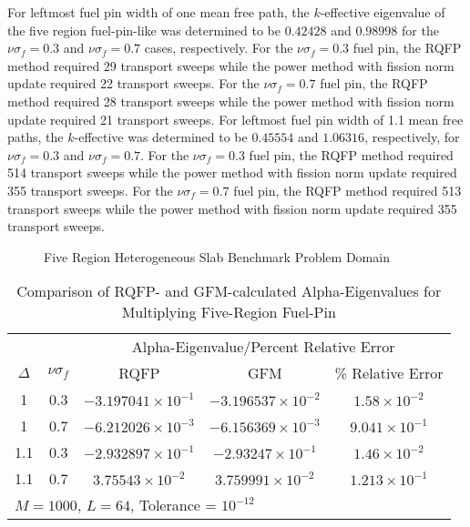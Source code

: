 For leftmost fuel pin width of one mean free path, the $k$-effective eigenvalue of the five region fuel-pin-like was determined to be $0.42428$ and $0.98998$ for the $\nu \sigma_{f} = 0.3$ and $\nu \sigma_{f} = 0.7$ cases, respectively. For the $\nu \sigma_{f} = 0.3$ fuel pin, the RQFP method required 29 transport sweeps while the power method with fission norm update required 22 transport sweeps. For the $\nu \sigma_{f} = 0.7$ fuel pin, the RQFP method required 28 transport sweeps while the power method with fission norm update required 21 transport sweeps. For leftmost fuel pin width of 1.1 mean free paths, the $k$-effective was determined to be $0.45554$ and $1.06316$, respectively, for  $\nu \sigma_{f} = 0.3$ and $\nu \sigma_{f} = 0.7$. For the $\nu \sigma_{f} = 0.3$ fuel pin, the RQFP method required 514 transport sweeps while the power method with fission norm update required 355 transport sweeps. For the $\nu \sigma_{f} = 0.7$ fuel pin, the RQFP method required 513 transport sweeps while the power method with fission norm update required 355 transport sweeps.

\begin{figure}[!htbp]
	\centering
	
	\caption{Five Region Heterogeneous Slab Benchmark Problem Domain \cite{kornreich_timeeigenvalue_2005}}
	\label{fig:FiveRegionProblem}
\end{figure}

\begin{table}[!htbp]
\centering{}
\caption{Comparison of RQFP- and GFM-calculated Alpha-Eigenvalues for Multiplying Five-Region Fuel-Pin}
\label{table:FiveRegionCases}
\begin{tabular}{@{}ccccc@{}}\toprule
& & \multicolumn{3}{c}{Alpha-Eigenvalue/Percent Relative Error} \\
\cmidrule{3-5} $\Delta$ & $\nu \sigma_{f}$ & RQFP & GFM & \% Relative Error \\
\midrule
1 & 0.3 & $-3.197041 \times 10^{-1}$ & $-3.196537 \times 10^{-2}$ & $1.58 \times 10^{-2}$ \\ 
1 & 0.7 & $-6.212026 \times 10^{-3}$ & $-6.156369 \times 10^{-3}$ & $9.041 \times 10^{-1}$ \\ 
1.1 & 0.3 & $-2.932897 \times 10^{-1}$ & $-2.93247 \times 10^{-1}$ & $1.46 \times 10 ^{-2}$ \\ 
1.1 & 0.7 & $3.75543 \times 10^{-2}$ & $3.759991 \times 10^{-2}$ & $1.213 \times 10^{-1}$ \\ 
\bottomrule
\multicolumn{5}{l}{$M = 1000$, $L = 64$, Tolerance = $10^{-12}$} \\
\end{tabular}
\end{table}

